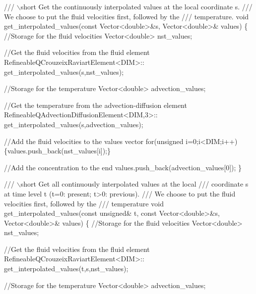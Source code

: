  
\begin{DoxyCodeInclude}
 \textcolor{comment}{/// \(\backslash\)short Get the continuously interpolated values at the local coordinate s.}
\textcolor{comment}{ /// We choose to put the fluid velocities first, followed by the}
\textcolor{comment}{}\textcolor{comment}{ /// temperature.}
\textcolor{comment}{} \textcolor{keywordtype}{void} get\_interpolated\_values(\textcolor{keyword}{const} Vector<double>&s,  Vector<double>& values)
  \{
   \textcolor{comment}{//Storage for the fluid velocities}
   Vector<double> nst\_values;

   \textcolor{comment}{//Get the fluid velocities from the fluid element}
   RefineableQCrouzeixRaviartElement<DIM>::
    get\_interpolated\_values(s,nst\_values);

   \textcolor{comment}{//Storage for the temperature}
   Vector<double> advection\_values;

   \textcolor{comment}{//Get the temperature from the advection-diffusion element}
   RefineableQAdvectionDiffusionElement<DIM,3>::
    get\_interpolated\_values(s,advection\_values);
 
   \textcolor{comment}{//Add the fluid velocities to the values vector}
   \textcolor{keywordflow}{for}(\textcolor{keywordtype}{unsigned} i=0;i<DIM;i++) \{values.push\_back(nst\_values[i]);\}  

   \textcolor{comment}{//Add the concentration to the end}
   values.push\_back(advection\_values[0]);
  \}


 \textcolor{comment}{}
\textcolor{comment}{ /// \(\backslash\)short Get all continuously interpolated values at the local }
\textcolor{comment}{ /// coordinate s at time level t (t=0: present; t>0: previous).}
\textcolor{comment}{ /// We choose to put the fluid velocities first, followed by the}
\textcolor{comment}{ /// temperature}
\textcolor{comment}{} \textcolor{keywordtype}{void} get\_interpolated\_values(\textcolor{keyword}{const} \textcolor{keywordtype}{unsigned}& t, \textcolor{keyword}{const} Vector<double>&s,
                              Vector<double>& values)
  \{
   \textcolor{comment}{//Storage for the fluid velocities}
   Vector<double> nst\_values;

   \textcolor{comment}{//Get the fluid velocities from the fluid element}
   RefineableQCrouzeixRaviartElement<DIM>::
    get\_interpolated\_values(t,s,nst\_values);

   \textcolor{comment}{//Storage for the temperature}
   Vector<double> advection\_values;


\end{DoxyCodeInclude}
